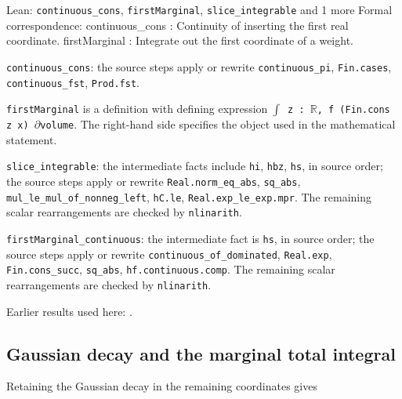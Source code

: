 \documentclass[11pt,a4paper]{report}
\begin{document}
\begin{leanbox}{Lean: \texttt{continuous\_\allowbreak{}cons}, \texttt{firstMarginal}, \texttt{slice\_\allowbreak{}integrable} and 1 more}
Formal correspondence: continuous\_cons : Continuity of inserting the first real coordinate. firstMarginal : Integrate out the first coordinate of a weight.



\texttt{continuous\_\allowbreak{}cons}: the source steps apply or rewrite \texttt{continuous\_\allowbreak{}pi}, \texttt{Fin.\allowbreak{}cases}, \texttt{continuous\_\allowbreak{}fst}, \texttt{Prod.\allowbreak{}fst}.



\texttt{first\allowbreak{}Marginal} is a definition with defining expression \texttt{\ensuremath{\int} z : \ensuremath{\mathbb R}, f (Fin.\allowbreak{}cons z x) \ensuremath{\partial}volume}. The right-hand side specifies the object used in the mathematical statement.



\texttt{slice\_\allowbreak{}integrable}: the intermediate facts include \texttt{hi}, \texttt{hbz}, \texttt{hs}, in source order; the source steps apply or rewrite \texttt{Real.\allowbreak{}norm\_\allowbreak{}eq\_\allowbreak{}abs}, \texttt{sq\_\allowbreak{}abs}, \texttt{mul\_\allowbreak{}le\_\allowbreak{}mul\_\allowbreak{}of\_\allowbreak{}nonneg\_\allowbreak{}left}, \texttt{h\allowbreak{}C.\allowbreak{}le}, \texttt{Real.\allowbreak{}exp\_\allowbreak{}le\_\allowbreak{}exp.\allowbreak{}mpr}. The remaining scalar rearrangements are checked by \texttt{nlinarith}.



\texttt{first\allowbreak{}Marginal\_\allowbreak{}continuous}: the intermediate fact is \texttt{hs}, in source order; the source steps apply or rewrite \texttt{continuous\_\allowbreak{}of\_\allowbreak{}dominated}, \texttt{Real.\allowbreak{}exp}, \texttt{Fin.\allowbreak{}cons\_\allowbreak{}succ}, \texttt{sq\_\allowbreak{}abs}, \texttt{hf.\allowbreak{}continuous.\allowbreak{}comp}. The remaining scalar rearrangements are checked by \texttt{nlinarith}.
\end{leanbox}


Earlier results used here: \cite[Section~3.26.4]{LangevinLean2026ULASC}.
\subsection{\texorpdfstring{Gaussian decay and the marginal total integral}{Gaussian decay and the marginal total integral}}
\label{report-step-IPLA-PrekopaTensorization-lean-3}


Retaining the Gaussian decay in the remaining coordinates gives
\end{document}

